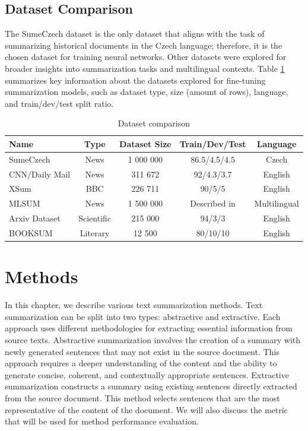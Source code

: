 \documentclass[english, ba, kiv, he, iso690numb, pdf, viewonly]{fasthesis}
\begin{document}
	\section{Dataset Comparison}
	The SumeCzech dataset is the only dataset that aligns with the task of summarizing historical documents in the Czech language; therefore, it is the chosen dataset for training neural networks. Other datasets were explored for broader insights into summarization tasks and multilingual contexts. Table \ref{tab:datasets} summarizes key information about the datasets explored for fine-tuning summarization models, such as dataset type, size (amount of rows), language, and train/dev/test split ratio.
	
	\begin{table}[htbp]
		\centering
		\caption{Dataset comparison}
		\label{tab:datasets}
		\begin{tabular}{lcccc}
			\toprule
			\textbf{Name} & \textbf{Type} & \textbf{Dataset Size} & \textbf{Train/Dev/Test} & \textbf{Language} \\
			\midrule
			SumeCzech & News & 1 000 000 & 86.5/4.5/4.5 & Czech \\
			CNN/Daily Mail & News & 311 672 & 92/4.3/3.7 & English \\
			XSum & BBC & 226 711 & 90/5/5 & English \\
			MLSUM & News & 1 500 000 & Described in \cite{scialom2020mlsum} & Multilingual \\
			Arxiv Dataset & Scientific & 215 000 & 94/3/3 & English \\
			BOOKSUM & Literary & 12 500 & 80/10/10 & English \\
			\bottomrule
		\end{tabular}
	\end{table}
	
	
	\chapter{Methods} \label{methods}
	In this chapter, we describe various text summarization methods.  
	Text summarization can be split into two types: abstractive and extractive. Each approach uses different methodologies for extracting essential information from source texts. Abstractive summarization involves the creation of a summary with newly generated sentences that may not exist in the source document. This approach requires a deeper understanding of the content and the ability to generate concise, coherent, and contextually appropriate sentences. Extractive summarization constructs a summary using existing sentences directly extracted from the source document. This method selects sentences that are the most representative of the content of the document. We will also discuss the metric that will be used for method performance evaluation.
\end{document}
